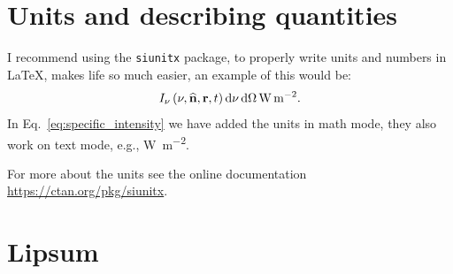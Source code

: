 \documentclass[
    10pt,
    a4paper,
    ]{article}
\begin{document}
\section{Units and describing quantities}

I recommend using the \texttt{siunitx} package, to properly write units and numbers in \LaTeX, makes life so much easier, an example of this would be:
\begin{equation}
    I_\nu\del{\nu,\widehat{\mathbf{n}}, \mathbf{r}, t}\dif\nu\dif\Omega \, \unit{\watt\per\m\squared}.
    \label{eq:specific_intensity}
\end{equation}
In Eq.~\eqref{eq:specific_intensity} we have added the units in math mode, they also work on text mode, e.g., \unit{\watt\per\m\squared}. 

For more about the units see the online documentation \url{https://ctan.org/pkg/siunitx}.

\section{Lipsum}
\lipsum[2-4]



\end{document}
